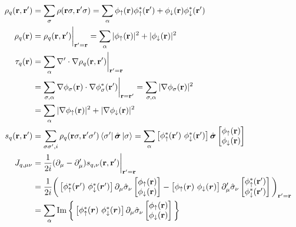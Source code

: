 \begin{align}
    \rho_q(\mathbf r, \mathbf r') &= \sum_{\sigma}\rho(\mathbf r\sigma, \mathbf r'\sigma) =\sum_{\alpha} \phi_{\uparrow}(\mathbf r)\phi_{\uparrow}^*(\mathbf r')+\phi_{\downarrow}(\mathbf r)\phi_{\downarrow}^*(\mathbf r')
    \\\rho_q(\mathbf r) &= \rho_q(\mathbf r, \mathbf r')\bigg|_{\mathbf r'=\mathbf r} =\sum_{\alpha} |\phi_{\uparrow}(\mathbf r)|^2+|\phi_{\downarrow}(\mathbf r)|^2
    \\\tau_q(\mathbf r) &= \sum_{\alpha} \nabla'\cdot\nabla\rho_q(\mathbf r, \mathbf r')\bigg|_{\mathbf r'=\mathbf r} 
    \\&= \sum_{\sigma, \alpha} \nabla \phi_\sigma (\mathbf r)\cdot \nabla \phi_\sigma^*(\mathbf r')\bigg|_{\mathbf r = \mathbf r'} = \sum_{\sigma, \alpha} |\nabla \phi_\sigma(\mathbf r)|^2 
    \\&= \sum_{\alpha}|\nabla \phi_\uparrow(\mathbf r)|^2 + |\nabla \phi_\downarrow(\mathbf r)|^2
    \\s_q(\mathbf r, \mathbf r') &=\sum_{\sigma \sigma', i} \rho_q(\mathbf r \sigma, \mathbf r' \sigma')\bra{\sigma'} \hat {\boldsymbol{\sigma}} \ket{\sigma} = \sum_{\alpha} \begin{bmatrix} \phi_{\uparrow}^*(\mathbf r') \ \phi_{\downarrow}^*(\mathbf r') \end{bmatrix}\hat{\boldsymbol{\sigma}} \begin{bmatrix} \phi_{\uparrow}(\mathbf r) \\ \phi_{\downarrow}(\mathbf r) \end{bmatrix}
    \\J_{q, \mu\nu} &= \frac 1 {2i}(\partial_\mu - \partial_\mu') s_{q, \nu}(\mathbf r, \mathbf r')\bigg|_{\mathbf r'=\mathbf r}\\
    &= \frac 1 {2i}\bigg(\begin{bmatrix}\phi_{\uparrow}^*(\boldsymbol r')\ \phi_{\downarrow}^*(\boldsymbol r')\end{bmatrix} \partial_\mu\hat{\sigma}_\nu\begin{bmatrix} \phi_{\uparrow}(\mathbf r) \\ \phi_{\downarrow}(\mathbf r) \end{bmatrix} - \begin{bmatrix}\phi_{\uparrow}(\boldsymbol{r})\ \phi_{\downarrow}(\boldsymbol{r})\end{bmatrix} \partial_\mu'\hat{\sigma}_\nu\begin{bmatrix} \phi_{\uparrow}^*(\mathbf r') \\ \phi_{\downarrow}^*(\mathbf r') \end{bmatrix}\bigg)_{\mathbf r'=\mathbf r}
     \\&= \sum_\alpha\Im\bigg\{\begin{bmatrix}\phi_{\uparrow}^*(\boldsymbol r)\ \phi_{\downarrow}^*(\boldsymbol r) \end{bmatrix}\partial_\mu \hat{\sigma}_\nu\begin{bmatrix} \phi_{\uparrow}(\mathbf r) \\ \phi_{\downarrow}(\mathbf r) \end{bmatrix}\bigg\}
\end{align}
